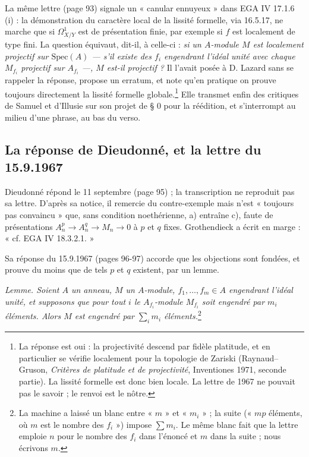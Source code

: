 \documentclass[11pt,a4paper]{article}
\begin{document}
La même lettre (page 93) signale un « canular ennuyeux » dans EGA IV 17.1.6
(i) : la démonstration du caractère local de la lissité formelle, via
16.5.17, ne marche que si $\Omega^1_{X/Y}$ est de présentation finie, par
exemple si $f$ est localement de type fini. La question équivaut, dit-il, à
celle-ci : \emph{si un $A$-module $M$ est localement projectif sur
$\mathrm{Spec}(A)$ --- s'il existe des $f_i$ engendrant l'idéal unité avec
chaque $M_{f_i}$ projectif sur $A_{f_i}$ ---, $M$ est-il projectif ?} Il
l'avait posée à D. Lazard sans se rappeler la réponse, propose un erratum, et
note qu'en pratique on prouve toujours directement la lissité formelle
globale.\footnote{La réponse est oui : la projectivité descend par
fidèle platitude, et en particulier se vérifie localement pour la topologie
de Zariski (Raynaud--Gruson, \emph{Critères de platitude et de projectivité},
Inventiones 1971, seconde partie). La lissité formelle est donc bien locale.
La lettre de 1967 ne pouvait pas le savoir ; le renvoi est le nôtre.}
Elle transmet enfin des critiques de Samuel et d'Illusie sur son projet de
§ 0 pour la réédition, et s'interrompt au milieu d'une phrase, au bas du
verso.

\subsection*{La réponse de Dieudonné, et la lettre du 15.9.1967}

Dieudonné répond le 11 septembre (page 95) ; la transcription ne reproduit
pas sa lettre. D'après sa notice, il remercie du contre-exemple mais n'est
« toujours pas convaincu » que, sans condition noethérienne, a) entraîne c),
faute de présentations $A_n^p \to A_n^q \to M_n \to 0$ à $p$ et $q$ fixes.
Grothendieck a écrit en marge : « cf. EGA IV 18.3.2.1. »

Sa réponse du 15.9.1967 (pages 96-97) accorde que les objections sont
fondées, et prouve du moins que de tels $p$ et $q$ existent, par un lemme.

\emph{Lemme. Soient $A$ un anneau, $M$ un $A$-module, $f_1, \ldots, f_m \in A$
engendrant l'idéal unité, et supposons que pour tout $i$ le $A_{f_i}$-module
$M_{f_i}$ soit engendré par $m_i$ éléments. Alors $M$ est engendré par
$\sum_i m_i$ éléments.}\footnote{La machine a laissé un blanc entre « $m$ » et
« $m_i$ » ; la suite (« $mp$ éléments, où $m$ est le nombre des $f_i$ »)
impose $\sum m_i$. Le même blanc fait que la lettre emploie $n$ pour le nombre
des $f_i$ dans l'énoncé et $m$ dans la suite ; nous écrivons $m$.}
\end{document}
